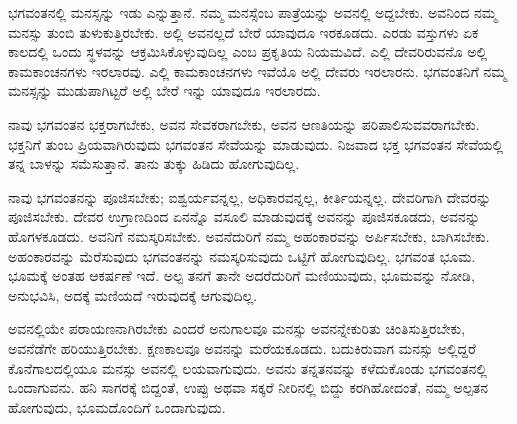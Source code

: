 ಭಗವಂತನಲ್ಲಿ ಮನಸ್ಸನ್ನು ಇಡು ಎನ್ನುತ್ತಾನೆ. ನಮ್ಮ ಮನಸ್ಸೆಂಬ ಪಾತ್ರೆಯನ್ನು ಅವನಲ್ಲಿ ಅದ್ದಬೇಕು. ಅವನಿಂದ ನಮ್ಮ ಮನಸ್ಸು ತುಂಬಿ ತುಳುಕುತ್ತಿರಬೇಕು. ಅಲ್ಲಿ ಅವನಲ್ಲದೆ ಬೇರೆ ಯಾವುದೂ ಇರಕೂಡದು. ಎರಡು ವಸ್ತುಗಳು ಏಕ ಕಾಲದಲ್ಲಿ ಒಂದು ಸ್ಥಳವನ್ನು ಆಕ್ರಮಿಸಿಕೊಳ್ಳುವುದಿಲ್ಲ ಎಂಬ ಪ್ರಕೃತಿಯ ನಿಯಮವಿದೆ. ಎಲ್ಲಿ ದೇವರಿರುವನೊ ಅಲ್ಲಿ ಕಾಮಕಾಂಚನಗಳು ಇರಲಾರವು. ಎಲ್ಲಿ ಕಾಮಕಾಂಚನಗಳು ಇವೆಯೊ ಅಲ್ಲಿ ದೇವರು ಇರಲಾರನು. ಭಗವಂತನಿಗೆ ನಮ್ಮ ಮನಸ್ಸನ್ನು ಮುಡುಪಾಗಿಟ್ಟರೆ ಅಲ್ಲಿ ಬೇರೆ ಇನ್ನು ಯಾವುದೂ ಇರಲಾರದು.

ನಾವು ಭಗವಂತನ ಭಕ್ತರಾಗಬೇಕು, ಅವನ ಸೇವಕರಾಗಬೇಕು, ಅವನ ಆಣತಿಯನ್ನು ಪರಿಪಾಲಿಸುವವರಾಗಬೇಕು. ಭಕ್ತನಿಗೆ ತುಂಬ ಪ್ರಿಯವಾಗಿರುವುದು ಭಗವಂತನ ಸೇವೆಯನ್ನು ಮಾಡುವುದು. ನಿಜವಾದ ಭಕ್ತ ಭಗವಂತನ ಸೇವೆಯಲ್ಲಿ ತನ್ನ ಬಾಳನ್ನು ಸಮೆಸುತ್ತಾನೆ. ತಾನು ತುಕ್ಕು ಹಿಡಿದು ಹೋಗುವುದಿಲ್ಲ.

ನಾವು ಭಗವಂತನನ್ನು ಪೂಜಿಸಬೇಕು; ಐಶ್ವರ್ಯವನ್ನಲ್ಲ, ಅಧಿಕಾರವನ್ನಲ್ಲ, ಕೀರ್ತಿಯನ್ನಲ್ಲ. ದೇವರಿಗಾಗಿ ದೇವರನ್ನು ಪೂಜಿಸಬೇಕು. ದೇವರ ಉಗ್ರಾಣದಿಂದ ಏನನ್ನೊ ವಸೂಲಿ ಮಾಡುವುದಕ್ಕೆ ಅವನನ್ನು ಪೂಜಿಸಕೂಡದು, ಅವನನ್ನು ಹೊಗಳಕೂಡದು. ಅವನಿಗೆ ನಮಸ್ಕರಿಸಬೇಕು. ಅವನೆದುರಿಗೆ ನಮ್ಮ ಅಹಂಕಾರವನ್ನು ಅರ್ಪಿಸಬೇಕು, ಬಾಗಿಸಬೇಕು. ಅಹಂಕಾರವನ್ನು ಮೆರೆಸುವುದು ಭಗವಂತನನ್ನು ನಮಸ್ಕರಿಸುವುದು ಒಟ್ಟಿಗೆ ಹೋಗುವುದಿಲ್ಲ. ಭಗವಂತ ಭೂಮ. ಭೂಮಕ್ಕೆ ಅಂತಹ ಆಕರ್ಷಣೆ ಇದೆ. ಅಲ್ಪ ತನಗೆ ತಾನೇ ಅದರೆದುರಿಗೆ ಮಣಿಯುವುದು, ಭೂಮವನ್ನು ನೋಡಿ, ಅನುಭವಿಸಿ, ಅದಕ್ಕೆ ಮಣಿಯದೆ ಇರುವುದಕ್ಕೆ ಆಗುವುದಿಲ್ಲ.

ಅವನಲ್ಲಿಯೇ ಪರಾಯಣನಾಗಿರಬೇಕು ಎಂದರೆ ಅನುಗಾಲವೂ ಮನಸ್ಸು ಅವನನ್ನೇ\break ಕುರಿತು ಚಿಂತಿಸುತ್ತಿರಬೇಕು, ಅವನೆಡೆಗೇ ಹರಿಯುತ್ತಿರಬೇಕು. ಕ್ಷಣಕಾಲವೂ ಅವನನ್ನು ಮರೆಯ\-ಕೂಡದು. ಬದುಕಿರುವಾಗ ಮನಸ್ಸು ಅಲ್ಲಿದ್ದರೆ ಕೊನೆಗಾಲದಲ್ಲಿಯೂ ಮನಸ್ಸು ಅವನಲ್ಲಿ ಲಯವಾಗುವುದು. ಅವನು ತನ್ನತನವನ್ನು ಕಳೆದುಕೊಂಡು ಭಗವಂತನಲ್ಲಿ ಒಂದಾಗುವನು. ಹನಿ ಸಾಗರಕ್ಕೆ ಬಿದ್ದಂತೆ, ಉಪ್ಪು ಅಥವಾ ಸಕ್ಕರೆ ನೀರಿನಲ್ಲಿ ಬಿದ್ದು ಕರಗಿಹೋದಂತೆ, ನಮ್ಮ ಅಲ್ಪತನ ಹೋಗುವುದು, ಭೂಮದೊಂದಿಗೆ ಒಂದಾಗುವುದು.

